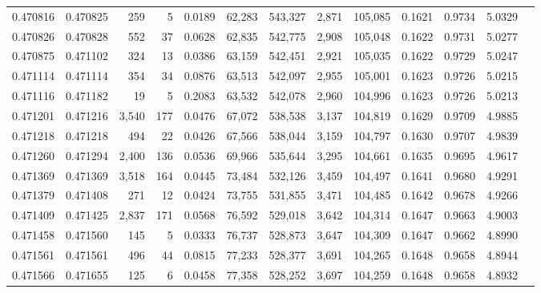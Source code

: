 \begin{tabular}{rrrrrrrrrrrrr}
0.470816 & 0.470825 &   259 &     5 &                                     0.0189 &  62,283 & 543,327 &   2,871 & 105,085 & 0.1621 & 0.9734 & 5.0329 \\
0.470826 & 0.470828 &   552 &    37 &                                     0.0628 &  62,835 & 542,775 &   2,908 & 105,048 & 0.1622 & 0.9731 & 5.0277 \\
0.470875 & 0.471102 &   324 &    13 &                                     0.0386 &  63,159 & 542,451 &   2,921 & 105,035 & 0.1622 & 0.9729 & 5.0247 \\
0.471114 & 0.471114 &   354 &    34 &                                     0.0876 &  63,513 & 542,097 &   2,955 & 105,001 & 0.1623 & 0.9726 & 5.0215 \\
0.471116 & 0.471182 &    19 &     5 &                                     0.2083 &  63,532 & 542,078 &   2,960 & 104,996 & 0.1623 & 0.9726 & 5.0213 \\
0.471201 & 0.471216 & 3,540 &   177 &                                     0.0476 &  67,072 & 538,538 &   3,137 & 104,819 & 0.1629 & 0.9709 & 4.9885 \\
0.471218 & 0.471218 &   494 &    22 &                                     0.0426 &  67,566 & 538,044 &   3,159 & 104,797 & 0.1630 & 0.9707 & 4.9839 \\
0.471260 & 0.471294 & 2,400 &   136 &                                     0.0536 &  69,966 & 535,644 &   3,295 & 104,661 & 0.1635 & 0.9695 & 4.9617 \\
0.471369 & 0.471369 & 3,518 &   164 &                                     0.0445 &  73,484 & 532,126 &   3,459 & 104,497 & 0.1641 & 0.9680 & 4.9291 \\
0.471379 & 0.471408 &   271 &    12 &                                     0.0424 &  73,755 & 531,855 &   3,471 & 104,485 & 0.1642 & 0.9678 & 4.9266 \\
0.471409 & 0.471425 & 2,837 &   171 &                                     0.0568 &  76,592 & 529,018 &   3,642 & 104,314 & 0.1647 & 0.9663 & 4.9003 \\
0.471458 & 0.471560 &   145 &     5 &                                     0.0333 &  76,737 & 528,873 &   3,647 & 104,309 & 0.1647 & 0.9662 & 4.8990 \\
0.471561 & 0.471561 &   496 &    44 &                                     0.0815 &  77,233 & 528,377 &   3,691 & 104,265 & 0.1648 & 0.9658 & 4.8944 \\
0.471566 & 0.471655 &   125 &     6 &                                     0.0458 &  77,358 & 528,252 &   3,697 & 104,259 & 0.1648 & 0.9658 & 4.8932 \\

\end{tabular}

